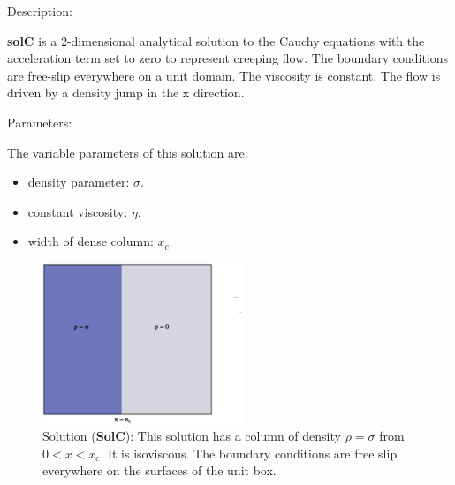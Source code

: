   {\large \fontB Description:}
  
  {\bf solC} is a 2-dimensional analytical solution to the Cauchy equations with the acceleration term set to zero
  to represent creeping flow. The boundary conditions are free-slip everywhere on a unit domain. The viscosity is constant.
  The flow is driven by a density jump in the x direction.

 {\large \fontB Parameters:}
  
 The variable parameters of this solution are:
 \begin{itemize}
   \item{density parameter: $ \sigma $.}
   \item{constant viscosity: $\eta$.}
   \item{width of dense column: $x_c$.}
 \end{itemize}

  \begin{figure}
    \includegraphics[width=6cm,clip]{../figs/figC.eps}
    \caption[Short caption]{\label{figC} 
      Solution ({\bf SolC}):
      This solution has a column of density $\rho = \sigma$ from $0 < x < x_c$.
      It is isoviscous.
      The boundary conditions are free slip everywhere on the surfaces of the unit box.}
  \end{figure} 
  

